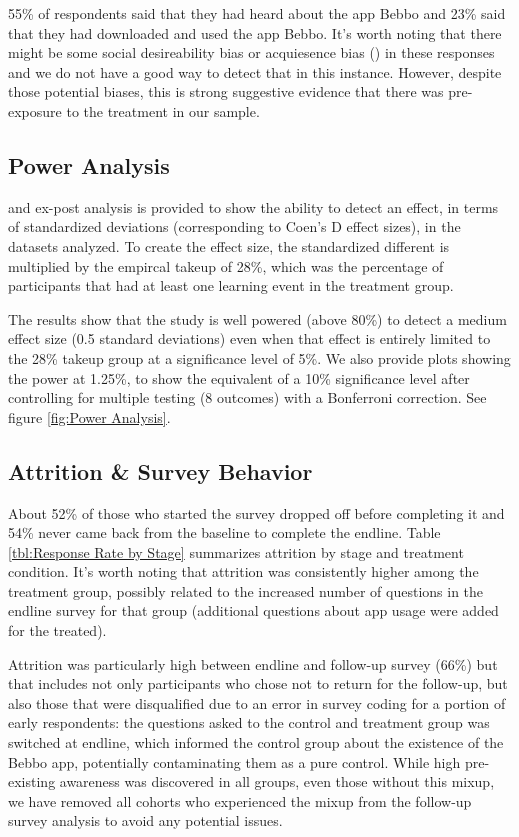 \documentclass{article}
\begin{document}
55\% of respondents said that they had heard about the app Bebbo and 23\% said that they had downloaded and used the app Bebbo. It's worth noting that there might be some social desireability bias or acquiesence bias (\cite{Stantcheva2023}) in these responses and we do not have a good way to detect that in this instance. However, despite those potential biases, this is strong suggestive evidence that there was pre-exposure to the treatment in our sample.



\subsection*{Power Analysis}

and ex-post analysis is provided to show the ability to detect an effect, in terms of standardized deviations (corresponding to Coen's D effect sizes), in the datasets analyzed. To create the effect size, the standardized different is multiplied by the empircal takeup of 28\%, which was the percentage of participants that had at least one learning event in the treatment group.

The results show that the study is well powered (above 80\%) to detect a medium effect size (0.5 standard deviations) even when that effect is entirely limited to the 28\% takeup group at a significance level of 5\%. We also provide plots showing the power at 1.25\%, to show the equivalent of a 10\% significance level after controlling for multiple testing (8 outcomes) with a Bonferroni correction. See figure \ref{fig:Power Analysis}.



\subsection*{Attrition \& Survey Behavior}

About 52\% of those who started the survey dropped off before completing it and 54\% never came back from the baseline to complete the endline. Table \ref{tbl:Response Rate by Stage} summarizes attrition by stage and treatment condition. It's worth noting that attrition was consistently higher among the treatment group, possibly related to the increased number of questions in the endline survey for that group (additional questions about app usage were added for the treated).

Attrition was particularly high between endline and follow-up survey (66\%) but that includes not only participants who chose not to return for the follow-up, but also those that were disqualified due to an error in survey coding for a portion of early respondents: the questions asked to the control and treatment group was switched at endline, which informed the control group about the existence of the Bebbo app, potentially contaminating them as a pure control. While high pre-existing awareness was discovered in all groups, even those without this mixup, we have removed all cohorts who experienced the mixup from the follow-up survey analysis to avoid any potential issues.
\end{document}
